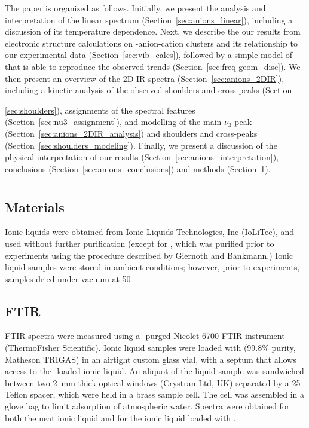 \documentclass[%
  class = book,%
  crop = false,%
  float = true,%
  multi = true,%
  preview = false,%
]{standalone}
\begin{document}
The paper is organized as follows. Initially, we present the analysis and interpretation of the linear  spectrum (Section~\ref{sec:anions_linear}), including a discussion of its temperature dependence. Next, we describe the our results from electronic structure calculations on -anion-cation clusters and its relationship to our experimental data (Section~\ref{sec:vib_calcs}), followed by a simple model of  that is able to reproduce the observed trends (Section~\ref{sec:freq-geom_disc}). We then present an overview of the 2D-IR spectra (Section~\ref{sec:anions_2DIR}), including a kinetic analysis of the observed shoulders and cross-peaks (Section~{\ref{sec:shoulders}), assignments of the spectral features (Section~\ref{sec:nu3_assignment}), and modelling of the main \(\nu_3\) peak (Section~\ref{sec:anions_2DIR_analysis}) and shoulders and cross-peaks (Section~\ref{sec:shoulders_modeling}). Finally, we present a discussion of the physical interpretation of our results (Section~\ref{sec:anions_interpretation}), conclusions (Section~\ref{sec:anions_conclusions}) and methods (Section~\ref{sec:anions_methods}).

\section{\texorpdfstring{}{Methods}}
\label{sec:anions_methods}

\subsection{Materials}
\label{sec:anions_methods_materials}

Ionic liquids were obtained from Ionic Liquids Technologies, Inc (IoLiTec), and used without further purification (except for \ce{[Im_{4,1}][BF4]}, which was purified prior to experiments using the procedure described by Giernoth and Bankmann.\cite{Giernoth2008}) Ionic liquid samples were stored in ambient conditions; however, prior to experiments, samples dried under vacuum at \SI{50}{\milli\torr}.

\subsection{FTIR}
\label{sec:anions_methods_ftir}

FTIR spectra were measured using a -purged Nicolet 6700 FTIR instrument (ThermoFisher Scientific). Ionic liquid samples were loaded with  (99.8\% purity, Matheson TRIGAS) in an airtight custom glass vial, with a septum that allows access to the -loaded ionic liquid. An aliquot of the liquid sample was sandwiched between two 2~mm-thick  optical windows (Crystran Ltd, UK) separated by a \SI{25}{\micron} Teflon spacer, which were held in a brass sample cell. The cell was assembled in a glove bag to limit adsorption of atmospheric water. Spectra were obtained for both the neat ionic liquid and for the ionic liquid loaded with .

}
\end{document}
